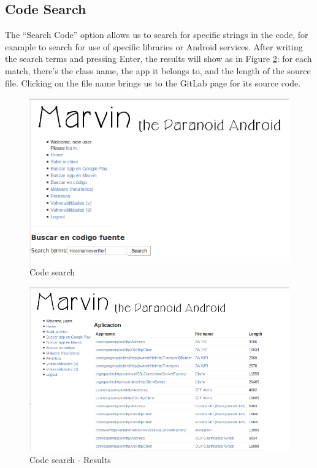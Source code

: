 \documentclass[11pt]{article}
\begin{document}
\subsection{Code Search}
The ``Search Code'' option allows us to search for specific strings in the code, for example to search for use of specific libraries or Android services. After writing the search terms and pressing Enter, the results will show as in Figure \ref{ssource2}: for each match, there's the class name, the app it belongs to, and the length of the source file. Clicking on the file name brings us to the GitLab page for its source code.

\begin{figure}[H]
\begin{center}
\includegraphics[width=.7\textwidth]{graphics/marvin_searchsource1.png}
\caption{Code search} \label{ssource1}
\end{center}
\end{figure}

\begin{figure}[H]
\begin{center}
\includegraphics[width=\textwidth]{graphics/marvin_searchsource2.png}
\caption{Code search - Results} \label{ssource2}
\end{center}
\end{figure}
\end{document}
